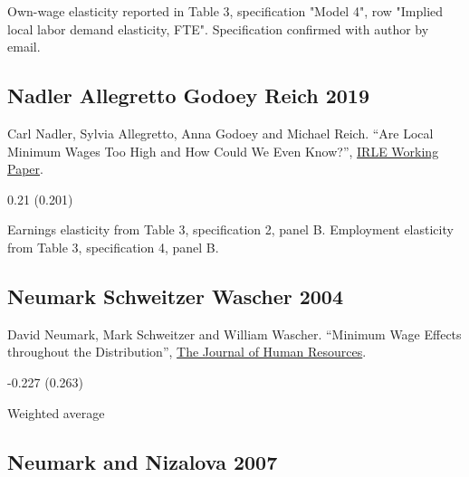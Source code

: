 \vspace{0.7em}

 Own-wage elasticity reported in Table 3, specification "Model 4", row "Implied local labor demand elasticity, FTE". Specification confirmed with author by email.

\subsection*{Nadler Allegretto Godoey Reich 2019}
\vspace{-0.7em}

\noindent Carl Nadler, Sylvia Allegretto, Anna Godoey and Michael Reich. ``Are Local Minimum Wages Too High and How Could We Even Know?'', \href{http://irle.berkeley.edu/files/2019/04/Are-Local-Minimum-Wages-Too-High.pdf}{IRLE Working Paper}.

\vspace{0.7em}

 0.21 (0.201)

\vspace{0.7em}

 Earnings elasticity from Table 3, specification 2, panel B. Employment elasticity from Table 3, specification 4, panel B.

\subsection*{Neumark Schweitzer Wascher 2004}
\vspace{-0.7em}

\noindent David Neumark, Mark Schweitzer and William Wascher. ``Minimum Wage Effects throughout the Distribution'', \href{https://doi.org/10.3368/jhr.XXXIX.2.425}{The Journal of Human Resources}.

\vspace{0.7em}

 -0.227 (0.263)

\vspace{0.7em}

 Weighted average

\subsection*{Neumark and Nizalova 2007}
\vspace{-0.7em}

